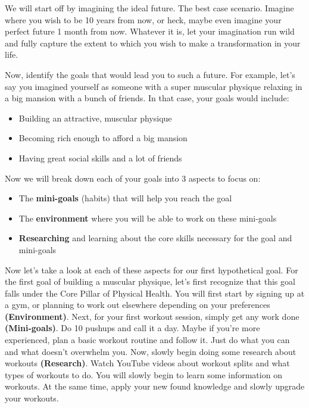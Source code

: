 \documentclass[
]{book}
\providecommand{\tightlist}{%
  \setlength{\itemsep}{0pt}\setlength{\parskip}{0pt}}
\begin{document}
We will start off by imagining the ideal future. The best case scenario. Imagine where you wish to be 10 years from now, or heck, maybe even imagine your perfect future 1 month from now. Whatever it is, let your imagination run wild and fully capture the extent to which you wish to make a transformation in your life.

Now, identify the goals that would lead you to such a future. For example, let's say you imagined yourself as someone with a super muscular physique relaxing in a big mansion with a bunch of friends. In that case, your goals would include:

\begin{itemize}
\tightlist
\item
  Building an attractive, muscular physique
\item
  Becoming rich enough to afford a big mansion
\item
  Having great social skills and a lot of friends
\end{itemize}

Now we will break down each of your goals into 3 aspects to focus on:

\begin{itemize}
\tightlist
\item
  The \textbf{mini-goals} (habits) that will help you reach the goal
\item
  The \textbf{environment} where you will be able to work on these mini-goals
\item
  \textbf{Researching} and learning about the core skills necessary for the goal and mini-goals
\end{itemize}

Now let's take a look at each of these aspects for our first hypothetical goal. For the first goal of building a muscular physique, let's first recognize that this goal falls under the Core Pillar of Physical Health. You will first start by signing up at a gym, or planning to work out elsewhere depending on your preferences \textbf{(Environment)}. Next, for your first workout session, simply get any work done \textbf{(Mini-goals)}. Do 10 pushups and call it a day. Maybe if you're more experienced, plan a basic workout routine and follow it. Just do what you can and what doesn't overwhelm you. Now, slowly begin doing some research about workouts \textbf{(Research)}. Watch YouTube videos about workout splits and what types of workouts to do. You will slowly begin to learn some information on workouts. At the same time, apply your new found knowledge and slowly upgrade your workouts.
\end{document}
